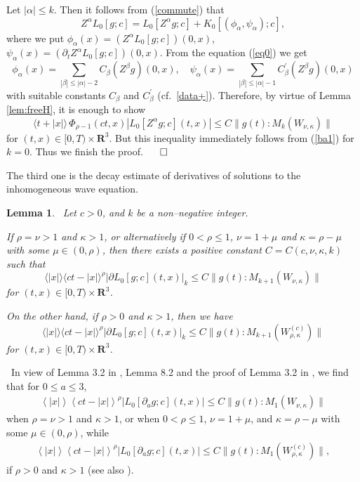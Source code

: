 \documentclass[12pt]{amsart}
\newcommand{\R}{{\mathbf R}}
\newcommand{\pa}{\partial}
\newcommand{\jb}[1]{\left\langle #1 \right\rangle}
\newtheorem{lemma}[theorem]{Lemma}
\numberwithin{equation}{section}
\begin{document}
Let $|\alpha| \le k$.
Then it follows from (\ref{commute}) that
\begin{equation}\label{ba11}
Z^\alpha L_0[g; c]=L_0[Z^\alpha g; c]+K_0[(\phi_\alpha,\psi_\alpha); c],
\end{equation}
where we put $\phi_\alpha(x)=(Z^\alpha L_0[g; c])(0,x)$, 
$\psi_\alpha(x)=(\partial_t Z^\alpha L_0[g; c])(0,x)$.
From the equation (\ref{eq0}) we get
$$
\phi_\alpha(x)= \sum_{|\beta| \le |\alpha|-2} C_\beta
(Z^\beta g)(0,x), \quad \psi_\alpha(x)= \sum_{|\beta| \le
|\alpha|-1} C_\beta^\prime (Z^\beta g)(0,x)
$$
with suitable constants $C_\beta$ and $C_\beta^\prime$ 
(cf.~\eqref{data+}). 
Therefore, by virtue of Lemma \ref{lem:freeH}, 
it is enough to show
\begin{equation}\nonumber
\langle t+|x| \rangle\,{\Phi}_{\rho-1}(ct,x) |L_{0}[Z^\alpha g; c](t,x)| 
 \le C \|g(t)\!:\!{M_k(W_{\nu,\kappa})}\|
\end{equation}
for $(t,x) \in [0,T) \times \R^3$.
But this inequality immediately follows from (\ref{ba1}) for $k=0$.
Thus we finish the proof.
\hfill$\qed$


\vspace{2mm}

The third one is the decay estimate of derivatives of solutions to the
inhomogeneous wave equation. 

\begin{lemma}\label{freeD}\
Let $c>0$, and $k$ be a non--negative integer. 

If $\rho=\nu>1$ and $\kappa>1$, or alternatively if
$0<\rho\le 1$, $\nu=1+\mu$ and $\kappa=\rho-\mu$ with some $\mu\in (0, \rho)$,
then there exists a positive constant $C=C(c,\nu,\kappa,k)$
such that
\begin{equation}\label{ba2}
 \langle |x| \rangle \langle ct -|x| \rangle^{\rho}
 |\partial L_{0}[g; c](t,x)|_k
 \le C \|g(t)\!:\!{M_{k+1}(W_{\nu,\kappa})}\|
\end{equation}
for $(t,x) \in [0,T) \times \R^3$.

On the other hand, if $\rho>0$ and $\kappa > 1$, then 
we have
\begin{equation}\label{poc0}
\langle |x| \rangle \langle ct-|x| \rangle^{\rho}
  |\partial L_{0}[g; c](t,x)|_k
 \le C \|g(t)\!:\!{M_{k+1}(W_{\rho,\kappa}^{(c)})}\|
\end{equation}
for $(t,x) \in [0,T) \times \R^3$.
\end{lemma}

\ 
In view of Lemma 3.2 in \cite{Kub-Yok01}, Lemma 8.2 and 
the proof of Lemma 3.2 in \cite{kayo}, we find
that for $0\le a\le 3$,
\begin{align}
\label{KatYok04} 
\jb{|x|}\jb{ct-|x|}^{\rho}|L_0[\pa_a g; c](t,x)|
 \le C \|g(t)\!:\!{M_1(W_{\nu,\kappa})}\|
\end{align}
when  $\rho=\nu>1$ and $\kappa>1$, or when $0<\rho\le1$, $\nu=1+\mu$, and $\kappa=\rho-\mu$ with some $\mu\in (0,\rho)$,
while
\begin{align}
\label{KatYok04-} 
\jb{|x|}\jb{ct-|x|}^{\rho}|L_0[\pa_a g; c](t,x)|
 \le C \|g(t)\!:\!{M_1(W_{\rho,\kappa}^{(c)})}\|,
\end{align}
if $\rho>0$ and $\kappa > 1$
(see also \cite{KaKu07}).
\end{document}

